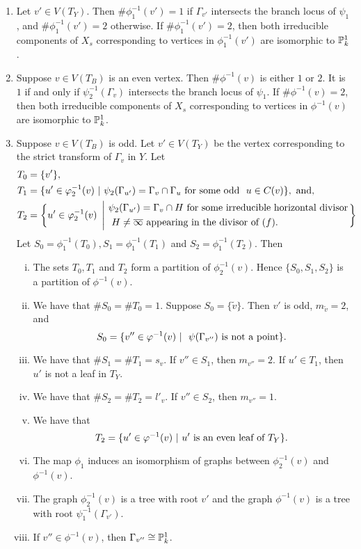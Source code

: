 \begin{lemma}\label{invimgphi} \hfill
\begin{enumerate}[\upshape (a)]
 \item Let $v' \in V(T_Y)$. Then $\#\phi_1^{-1}(v') = 1$ if $\Gamma_{v'}$ intersects the branch locus of $\psi_1$, and $\# \phi_1^{-1}(v') = 2$ otherwise. If $\# \phi_1^{-1}(v') = 2$, then both irreducible components of $X_s$ corresponding to vertices in $\phi_1^{-1}(v')$ are isomorphic to $\P^1_k$.
 \item  Suppose $v \in V(T_B)$ is an even vertex. Then $\# \phi^{-1}(v)$ is either $1$ or $2$. It is $1$ if and only if $\psi_2^{-1}(\Gamma_v)$ intersects the branch locus of $\psi_1$. If $\# \phi^{-1}(v) = 2$, then both irreducible components of $X_s$ corresponding to vertices in $\phi^{-1}(v)$ are isomorphic to $\P^1_k$.
 \item Suppose $v \in V(T_B)$ is odd. Let $v' \in V(T_Y)$ be the vertex corresponding to the strict transform of $\Gamma_v$ in $Y$. Let
 \begin{align*}
  T_0 &= \{ v' \}, \\
  T_1 &= \{ u' \in \phi_2^{-1}(v) \ | \ \psi_2(\Gamma_{u'}) = \Gamma_v \cap \Gamma_u \ \textup{for some odd } \ u \in C(v) \}, \ \textup{and}, \\
  T_2 &= \bigg\{ {u' \in \phi_2^{-1}(v) \ \left|  \ \begin{aligned} &\psi_2(\Gamma_{u'}) = \Gamma_v \cap H \ \textup{for some irreducible horizontal divisor} \\ &\textup{ $H \neq  \overline{\infty}$ appearing in the divisor of $(f)$}. \end{aligned} \right.  }  \bigg\}  
 \end{align*}
 Let $S_0 = \phi_1^{-1}(T_0) ,S_1 = \phi_1^{-1}(T_1)$ and $S_2 = \phi_1^{-1}(T_2)$. Then
 \begin{enumerate}[(i)]
 \item The sets $T_0,T_1$ and $T_2$ form a partition of $\phi_2^{-1}(v)$. Hence $\{ S_0,S_1,S_2 \}$ is a partition of $\phi^{-1}(v)$.
 \item We have that $\# S_0 = \# T_0 = 1$. Suppose $S_0 = \{ \tilde{v} \}$.  Then $v'$ is odd, $m_{\tilde{v}} = 2$, and
 \[ S_0 =\{ v'' \in \phi^{-1}(v) \ | \ \ \psi(\Gamma_{v''})\ \textup{is not a point} \}. \] 
 \item We have that $\# S_1 = \# T_1 = s_v$. If $v'' \in S_1$, then $m_{v''} = 2$. If $u' \in T_1$, then $u'$ is not a leaf in $T_Y$.
 \item We have that $\# S_2 = \# T_2 = l'_v$. If  $v'' \in S_2$, then $m_{v''} = 1$.
 \item We have that
 \[ T_2 = \{ u' \in \phi^{-1}(v) \ | \ u' \ \textup{is an even leaf of}\ T_Y \} .\]
 \item The map $\phi_1$ induces an isomorphism of graphs between $\phi_2^{-1}(v)$ and $\phi^{-1}(v)$. 
 \item The graph $\phi_2^{-1}(v)$ is a tree with root $v'$ and the graph $\phi^{-1}(v)$ is a tree with root $\psi_1^{-1}(\Gamma_{v'})$.
 \item If $v'' \in \phi^{-1}(v)$, then $\Gamma_{v''} \isom \P^1_k$.
 \end{enumerate}
 \end{enumerate}
\end{lemma}
